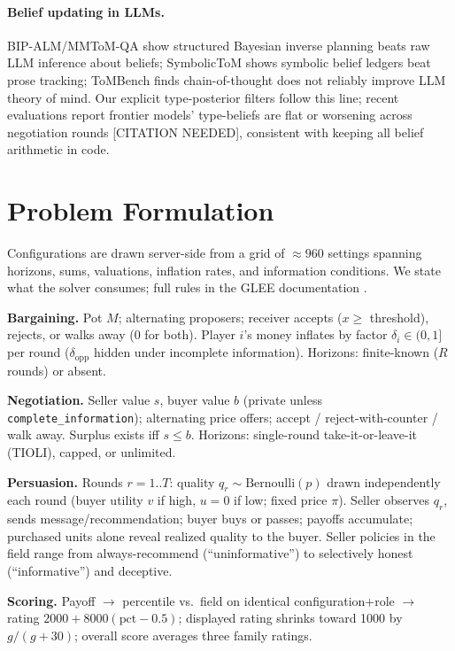\documentclass[11pt]{article}
\begin{document}
\paragraph{Belief updating in LLMs.} BIP-ALM/MMToM-QA \citep{jin2024mmtom} show structured Bayesian inverse planning beats raw LLM inference about beliefs; SymbolicToM \citep{sclar2023symbolictom} shows symbolic belief ledgers beat prose tracking; ToMBench \citep{chen2024tombench} finds chain-of-thought does not reliably improve LLM theory of mind. Our explicit type-posterior filters follow this line; recent evaluations report frontier models' type-beliefs are flat or worsening across negotiation rounds [CITATION NEEDED], consistent with keeping all belief arithmetic in code.

\section{Problem Formulation}
Configurations are drawn server-side from a grid of ${\approx}960$ settings spanning horizons, sums, valuations, inflation rates, and information conditions. We state what the solver consumes; full rules in the GLEE documentation \citep{shapira2024glee}.

\textbf{Bargaining.} Pot $M$; alternating proposers; receiver accepts ($x \geq$ threshold), rejects, or walks away ($0$ for both). Player $i$'s money inflates by factor $\delta_i \in (0,1]$ per round ($\delta_{\text{opp}}$ hidden under incomplete information). Horizons: finite-known ($R$ rounds) or absent.

\textbf{Negotiation.} Seller value $s$, buyer value $b$ (private unless \texttt{complete\_information}); alternating price offers; accept / reject-with-counter / walk away. Surplus exists iff $s \le b$. Horizons: single-round take-it-or-leave-it (TIOLI), capped, or unlimited.

\textbf{Persuasion.} Rounds $r=1..T$: quality $q_r \sim \mathrm{Bernoulli}(p)$ drawn independently each round (buyer utility $v$ if high, $u=0$ if low; fixed price $\pi$). Seller observes $q_r$, sends message/recommendation; buyer buys or passes; payoffs accumulate; purchased units alone reveal realized quality to the buyer. Seller policies in the field range from always-recommend (``uninformative'') to selectively honest (``informative'') and deceptive.

\textbf{Scoring.} Payoff $\to$ percentile vs.\ field on identical configuration+role $\to$ rating $2000 + 8000(\mathrm{pct}-0.5)$; displayed rating shrinks toward 1000 by $g/(g+30)$; overall score averages three family ratings.
\end{document}
